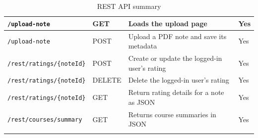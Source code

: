 \begin{longtable}{|p{}|p{}|p{}|p{}|}
            \texttt{/upload-note} & GET & Loads the upload page & Yes \\\hline
            \texttt{/upload-note} & POST & Upload a PDF note and save its metadata & Yes \\\hline
            \texttt{/rest/ratings/\{noteId\}} & POST & Create or update the logged-in user's rating & Yes \\\hline
            \texttt{/rest/ratings/\{noteId\}} & DELETE & Delete the logged-in user's rating & Yes \\\hline
            \texttt{/rest/ratings/\{noteId\}} & GET & Return rating details for a note as JSON & Yes \\\hline
            \texttt{/rest/courses/summary} & GET & Returns course summaries in JSON & Yes \\\hline

\caption{REST API summary}
\label{tab:rest-api-summary}
\end{longtable}
\newpage